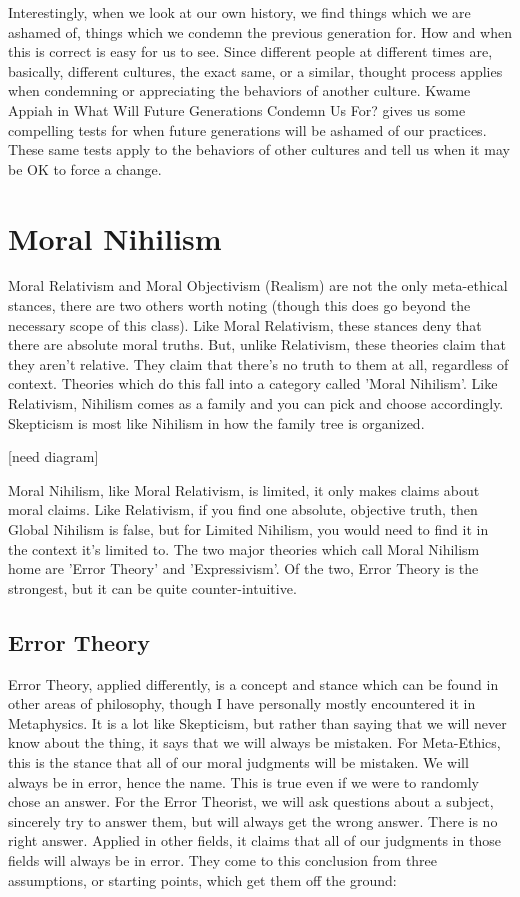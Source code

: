 Interestingly, when we look at our own history, we find things which we are ashamed of, things which we condemn the previous generation for. How and when this is correct is easy for us to see. Since different people at different times are, basically, different cultures, the exact same, or a similar, thought process applies when condemning or appreciating the behaviors of another culture. Kwame Appiah in What Will Future Generations Condemn Us For?\autocite{Appiah1} gives us some compelling tests for when future generations will be ashamed of our practices. These same tests apply to the behaviors of other cultures and tell us when it may be OK to force a change. 

\section{Moral Nihilism}

Moral Relativism and Moral Objectivism (Realism) are not the only meta-ethical stances, there are two others worth noting (though this does go beyond the necessary scope of this class). Like Moral Relativism, these stances deny that there are absolute moral truths. But, unlike Relativism, these theories claim that they aren't relative. They claim that there's no truth to them at all, regardless of context. Theories which do this fall into a category called 'Moral Nihilism'. Like Relativism, Nihilism comes as a family and you can pick and choose accordingly. Skepticism is most like Nihilism in how the family tree is organized. 

[need diagram]

Moral Nihilism, like Moral Relativism, is limited, it only makes claims about moral claims. Like Relativism, if you find one absolute, objective truth, then Global Nihilism is false, but for Limited Nihilism, you would need to find it in the context it's limited to. The two major theories which call Moral Nihilism home are 'Error Theory' and 'Expressivism'. Of the two, Error Theory is the strongest, but it can be quite counter-intuitive. 

\subsection{Error Theory}

Error Theory, applied differently, is a concept and stance which can be found in other areas of philosophy, though I have personally mostly encountered it in Metaphysics. It is a lot like Skepticism, but rather than saying that we will never know about the thing, it says that we will always be mistaken.  For Meta-Ethics, this is the stance that all of our moral judgments will be mistaken. We will always be in error, hence the name. This is true even if we were to randomly chose an answer. For the Error Theorist, we will ask questions about a subject, sincerely try to answer them, but will always get the wrong answer. There is no right answer.  Applied in other fields, it claims that all of our judgments in those fields will always be in error. They come to this conclusion from three assumptions, or starting points, which get them off the ground:

